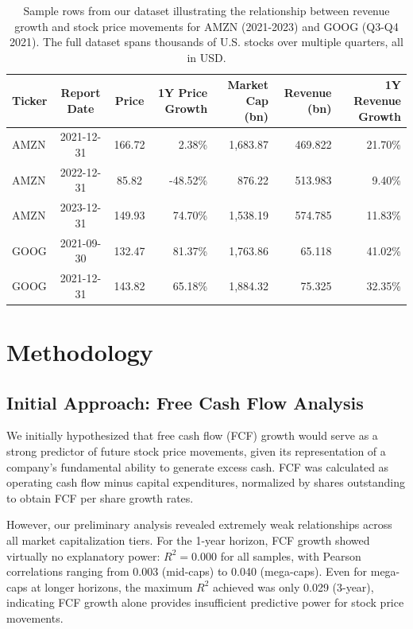 \documentclass[11pt]{article}
\begin{document}
\begin{table}[h]
  \setlength{\tabcolsep}{4pt}
  \centering
\caption{Sample rows from our dataset illustrating the relationship between revenue growth and stock price movements for AMZN (2021-2023) and GOOG (Q3-Q4 2021). The full dataset spans thousands of U.S. stocks over multiple quarters, all in USD.}
  \label{tab:sample-data}
  \begin{tabular}{lccrrrr}
    \toprule
    Ticker & Report Date & Price & 1Y Price Growth & Market Cap (bn) & Revenue (bn) & 1Y Revenue Growth \\
    \midrule
    AMZN & 2021-12-31 & 166.72 & 2.38\%   & 1,683.87 & 469.822 &  21.70\% \\
    AMZN & 2022-12-31 &  85.82 & -48.52\% &   876.22 & 513.983 &   9.40\% \\
    AMZN & 2023-12-31 & 149.93 & 74.70\%  & 1,538.19 & 574.785 &  11.83\% \\
    \midrule
    GOOG & 2021-09-30 & 132.47 & 81.37\%  & 1,763.86 & 65.118 &   41.02\% \\
    GOOG & 2021-12-31 & 143.82 & 65.18\%  & 1,884.32 & 75.325 &   32.35\% \\
    \bottomrule
  \end{tabular}
\end{table}

\section{Methodology}

\subsection{Initial Approach: Free Cash Flow Analysis}

We initially hypothesized that free cash flow (FCF) growth would serve as a strong predictor of future stock price movements, given its representation of a company's fundamental ability to generate excess cash. FCF was calculated as operating cash flow minus capital expenditures, normalized by shares outstanding to obtain FCF per share growth rates.

However, our preliminary analysis revealed extremely weak relationships across all market capitalization tiers. For the 1-year horizon, FCF growth showed virtually no explanatory power: $R^2 = 0.000$ for all samples, with Pearson correlations ranging from 0.003 (mid-caps) to 0.040 (mega-caps). Even for mega-caps at longer horizons, the maximum $R^2$ achieved was only 0.029 (3-year), indicating FCF growth alone provides insufficient predictive power for stock price movements.
\end{document}
